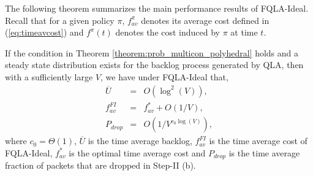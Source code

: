 \documentclass[journal]{IEEEtran}
\newcommand{\prob}{Pr}
\newcommand{\bv}[1]{{\boldsymbol{#1} }}
\begin{document}
The following theorem summarizes the main performance results of FQLA-Ideal. Recall that  for a given policy $\pi$, $f^{\pi}_{av}$ denotes its average cost defined in (\ref{eq:timeavcost}) and $f^{\pi}(t)$ denotes the cost induced by $\pi$ at time $t$. 

\begin{thm}\label{theorem:fqla_performance}
If the condition in Theorem \ref{theorem:prob_multicon_polyhedral} holds and a steady state distribution exists for the backlog process generated by QLA, then with a sufficiently large $V$, we have under FQLA-Ideal that,  
\begin{eqnarray}
\overline{U}&=&O(\log^2(V)),\label{theorem:fqla_backlog}\\
f^{FI}_{av}&=&f^*_{av}+O(1/V),\label{theorem:fqla_cost}\\
P_{drop} &=& O(1/V^{c_0\log(V)}),\label{theorem:fqla_pdrop}
\end{eqnarray}
where $c_0=\Theta(1)$, $\overline{U}$ is the time average backlog, $f_{av}^{FI}$ is the time average cost of FQLA-Ideal, $f^*_{av}$ is the optimal time average cost and $P_{drop}$ is the time average fraction of packets that are dropped in Step-II (b). 
\end{thm}
\end{document}
